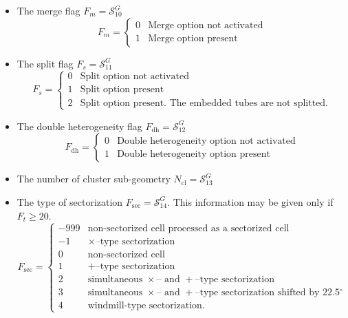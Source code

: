 \begin{itemize}
\item The merge flag $F_{m}=\mathcal{S}^{G}_{10}$ 
\begin{displaymath}
F_{m} = \left\{
\begin{array}{rl}
 0 & \textrm{Merge option not activated} \\
 1 & \textrm{Merge option present} 
\end{array} \right.
\end{displaymath}

\item The split flag $F_{s}=\mathcal{S}^{G}_{11}$ 
\begin{displaymath}
F_{s} = \left\{
\begin{array}{rl}
 0 & \textrm{Split option not activated} \\
 1 & \textrm{Split option present} \\
 2 & \textrm{Split option present. The embedded tubes are not splitted.} 
\end{array} \right.
\end{displaymath}

\item The double heterogeneity flag $F_{\mathrm{dh}}=\mathcal{S}^{G}_{12}$ 
\begin{displaymath}
F_{\mathrm{dh}} = \left\{
\begin{array}{rl}
 0 & \textrm{Double heterogeneity option not activated} \\
 1 & \textrm{Double heterogeneity option present} 
\end{array} \right.
\end{displaymath}

\item The number of cluster sub-geometry $N_{\mathrm{cl}}=\mathcal{S}^{G}_{13}$ 

\item The type of sectorization $F_{\mathrm{sec}}=\mathcal{S}^{G}_{14}$.
This information may be given only if $F_{t}\ge 20$.
\begin{displaymath}
F_{\mathrm{sec}} = \left\{
\begin{array}{rl}
-999 & \textrm{non-sectorized cell processed as a sectorized cell} \\
-1 & \textrm{$\times$--type sectorization} \\
 0 & \textrm{non-sectorized cell} \\
 1 & \textrm{$+$--type sectorization} \\
 2 & \textrm{simultaneous $\times$-- and $+$--type sectorization}  \\
 3 & \textrm{simultaneous $\times$-- and $+$--type sectorization shifted by 22.5$^\circ$} \\
 4 & \textrm{windmill-type sectorization.} 
\end{array} \right.
\end{displaymath}


\end{itemize}
